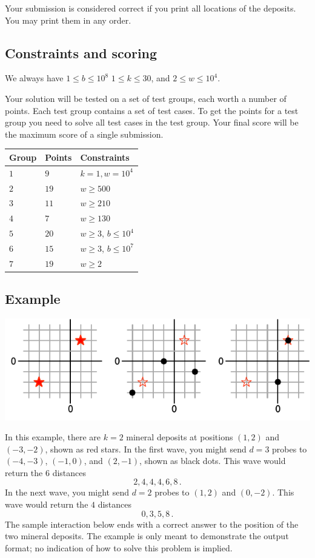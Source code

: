 Your submission is considered correct if you print all locations of the deposits.
You may print them in any order.

\subsection*{Constraints and scoring}

We always have 
$1\leq b \leq 10^8$ %
$1 \leq k \leq 30$, %
and
$2 \le w \le 10^4$. %

Your solution will be tested on a set of test groups, each worth a number of points.
Each test group contains a set of test cases.
To get the points for a test group you need to solve all test cases in the test group.
Your final score will be the maximum score of a single submission.

\medskip
\begin{tabular}{lll}
Group & Points & Constraints \\\hline
  $1$ & $9$ & $k = 1, w = 10^4$\\
  $2$ & $19$ & $w \ge 500$\\
  $3$ & $11$ & $w \ge 210$\\
  $4$ & $7$ & $w \ge 130$\\
  $5$ & $20$ & $w \ge 3$, $b \le 10^4$\\
  $6$ & $15$ & $w \ge 3$, $b \le 10^7$\\
  $7$ & $19$ & $w \ge 2$
\end{tabular}

\subsection*{Example}

\includegraphics[width=.6\textwidth]{img/sample1.pdf}

In this example, there are $k=2$ mineral deposits at positions $(1,2)$ and $(-3,-2)$, shown as red stars.
In the first wave, you might send $d=3$ probes to $(-4,-3)$, $(-1, 0)$, and $(2,-1)$, shown as black dots.
This wave would return the $6$ distances \[
  2, 4, 4, 4, 6, 8\,.
\]
In the next wave, you might send $d=2$ probes to $(1,2)$ and $(0,-2)$.
This wave would return the $4$ distances \[
  0, 3, 5, 8\,.
\]
The sample interaction below ends with a correct answer to the position of the two mineral deposits.
The example is only meant to demonstrate the output format; no indication of how to solve this problem is implied.
